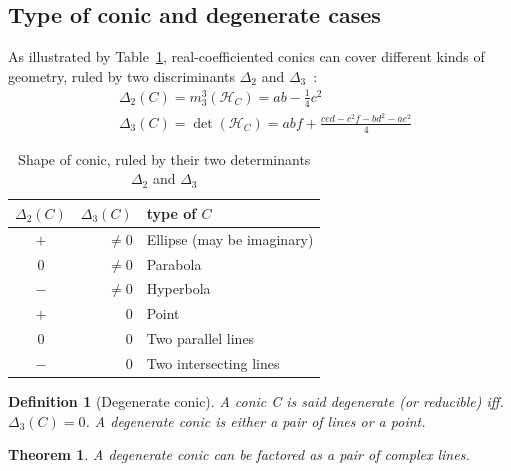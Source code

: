 \documentclass{birkjour}
\newtheorem{theorem}{Theorem}
\newtheorem{definition}{Definition}
\begin{document}
\subsection{Type of conic and degenerate cases}
\label{sec:type_of_a_conic_and_degenerate}
As illustrated by Table~\ref{tab:det}, real-coefficiented conics can cover different kinds of geometry, ruled by two discriminants \(\Delta_2\) and \(\Delta_3\)~\cite{richter-gebert_perspectives_2011}:
\begin{align} \label{eq:discriminants}
&\Delta_2(C) = m_{3}^3(\mathcal{H}_C) = ab - \frac{1}{4}c^2\\
&\Delta_3(C) = \det(\mathcal{H}_C) = abf + \frac{ced - c^2 f - bd^2 - ae^2 }{4}
\end{align}
\begin{table}[!ht]
\centering
\begin{tabular}{crl}
\(\Delta_2(C)\) & \(\Delta_3(C)\) & type of \(C\)\\
\hline
\(+\) & \(\ne 0\) & Ellipse (may be imaginary) \\
\(0\) & \(\ne 0\) & Parabola                   \\
\(-\) & \(\ne 0\) & Hyperbola                \\
\(+\) & \(0\)     & Point                    \\
\(0\) & \(0\)     & Two parallel lines       \\
\(-\) & \(0\)     & Two intersecting lines   \\
\end{tabular}
\caption{Shape of conic, ruled by their two determinants \(\Delta_2\) and \(\Delta_3\)}
\label{tab:det}
\end{table}
\begin{definition}[Degenerate conic]
A conic C is said degenerate (or reducible) iff. \(\Delta_3(C)=0\). A degenerate conic is either a pair of lines or a point.
\end{definition}
\begin{theorem}
A degenerate conic can be factored as a pair of complex lines.
\end{theorem}
\end{document}
